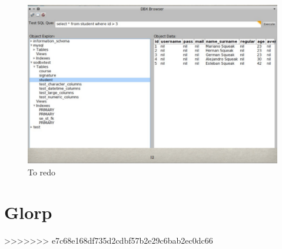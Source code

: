 \documentclass[a4paper,10pt,twoside]{book}
\begin{document}
\begin{figure}
\begin{center}
\includegraphics[width=\linewidth]{Browser}
\caption{To redo}
\end{center}
\end{figure}

\section{Glorp}






>>>>>>> e7c68e168df735d2cdbf57b2e29c6bab2ec0dc66
\ifx\wholebook\relax\else
   
   
\end{document}
